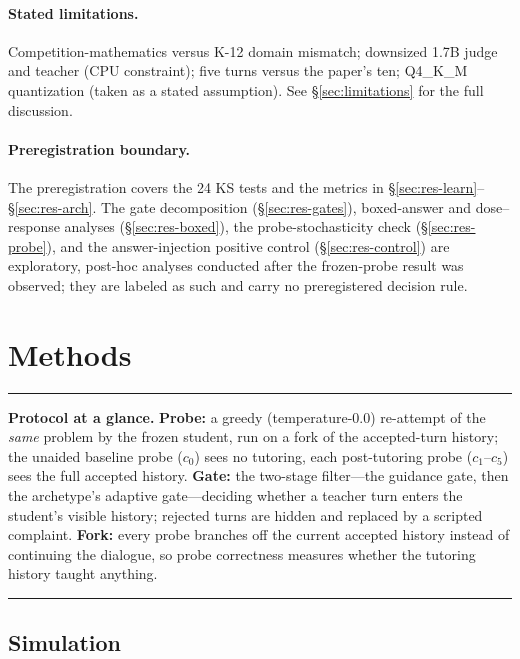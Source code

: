 \documentclass[notitlepage,12pt]{jedm}
\begin{document}
\paragraph{Stated limitations.} Competition-mathematics versus K-12 domain
mismatch; downsized 1.7B judge and teacher (CPU constraint); five turns
versus the paper's ten; Q4\_K\_M quantization (taken as a stated
assumption). See \S\ref{sec:limitations} for the full discussion.

\paragraph{Preregistration boundary.} The preregistration covers the 24 KS
tests and the metrics in \S\ref{sec:res-learn}--\S\ref{sec:res-arch}. The gate
decomposition (\S\ref{sec:res-gates}), boxed-answer and dose--response
analyses (\S\ref{sec:res-boxed}), the probe-stochasticity check
(\S\ref{sec:res-probe}), and the answer-injection positive control
(\S\ref{sec:res-control}) are exploratory, post-hoc analyses conducted after
the frozen-probe result was observed; they are labeled as such and carry no
preregistered decision rule.

\section{Methods}
\label{sec:methods}

\begin{center}
\begin{minipage}{0.94\columnwidth}
\hrule\vspace{0.6em}
\noindent\textbf{Protocol at a glance.} \textbf{Probe:} a greedy
(temperature-0.0) re-attempt of the \emph{same} problem by the frozen
student, run on a fork of the accepted-turn history; the unaided baseline
probe ($c_0$) sees no tutoring, each post-tutoring probe ($c_1$--$c_5$)
sees the full accepted history. \textbf{Gate:} the two-stage filter---the
guidance gate, then the archetype's adaptive gate---deciding whether a
teacher turn enters the student's visible history; rejected turns are
hidden and replaced by a scripted complaint. \textbf{Fork:} every probe
branches off the current accepted history instead of continuing the
dialogue, so probe correctness measures whether the tutoring history
taught anything.
\vspace{0.6em}\hrule
\end{minipage}
\end{center}

\subsection{Simulation}
\end{document}
